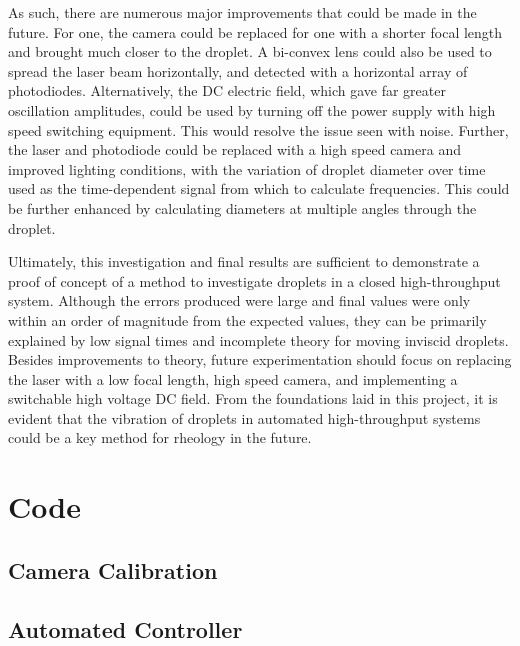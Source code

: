 \documentclass{physics_article_B}
\begin{document}
    As such, there are numerous major improvements that could be made in the future. For one, the camera could be replaced for one with a shorter focal length and brought much closer to the droplet. A bi-convex lens could also be used to spread the laser beam horizontally, and detected with a horizontal array of photodiodes. Alternatively, the DC electric field, which gave far greater oscillation amplitudes, could be used by turning off the power supply with high speed switching equipment. This would resolve the issue seen with noise. Further, the laser and photodiode could be replaced with a high speed camera and improved lighting conditions, with the variation of droplet diameter over time used as the time-dependent signal from which to calculate frequencies. This could be further enhanced by calculating diameters at multiple angles through the droplet. 

    Ultimately, this investigation and final results are sufficient to demonstrate a proof of concept of a method to investigate droplets in a closed high-throughput system. Although the errors produced were large and final values were only within an order of magnitude from the expected values, they can be primarily explained by low signal times and incomplete theory for moving inviscid droplets. Besides improvements to theory, future experimentation should focus on replacing the laser with a low focal length, high speed camera, and implementing a switchable high voltage DC field. From the foundations laid in this project, it is evident that the vibration of droplets in automated high-throughput systems could be a key method for rheology in the future.
    

\newpage



\newpage
\appendix{}
\section{Code}
    \subsection{Camera Calibration}
       
        
        
   \newpage\subsection{Automated Controller}
        

\end{document}
